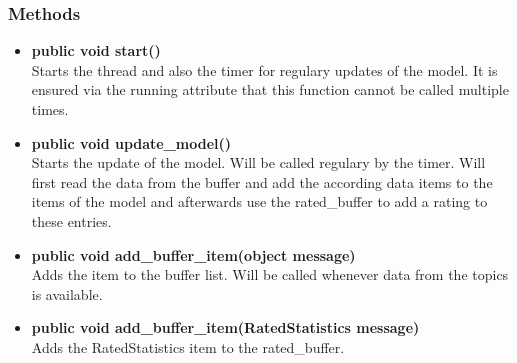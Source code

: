 \subsubsection{Methods}
\begin{itemize}
  \item \textbf{public void start()}\\
  Starts the thread and also the timer for regulary updates of the model. It is ensured via the running attribute that this function cannot be called multiple times.
  \item \textbf{public void update\_model()}\\ 
  Starts the update of the model. Will be called regulary by the timer. Will first read the data from the buffer and add the according data items to the items of the model and afterwards use the rated\_buffer to add a rating to these entries.
  \item \textbf{public void add\_buffer\_item(object message)}\\ 
  Adds the item to the buffer list. Will be called whenever data from the topics
  is available.
  \item \textbf{public void add\_buffer\_item(RatedStatistics message)}\\
  Adds the RatedStatistics item to the rated\_buffer.
\end{itemize}

